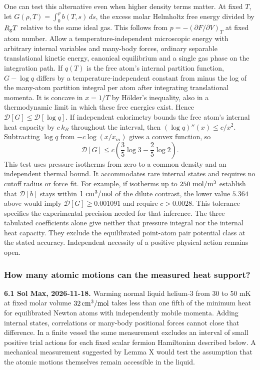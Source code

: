 \documentclass[11pt,a4paper]{article}
\begin{document}
One can test this alternative even when higher density terms matter. At
fixed \(T\), let \(G(\rho,T)=\int_0^\rho b(T,s)\,ds\), the excess molar
Helmholtz free energy divided by \(R_{\rm g}T\) relative to the same
ideal gas. This follows from \(p=-(\partial F/\partial V)_T\) at fixed
atom number. Allow a temperature-independent microscopic energy with
arbitrary internal variables and many-body forces, ordinary separable
translational kinetic energy, canonical equilibrium and a single gas
phase on the integration path. If \(q(T)\) is the free atom's internal
partition function, \(G-\log q\) differs by a temperature-independent
constant from minus the log of the many-atom partition integral per atom
after integrating translational momenta. It is concave in \(x=1/T\) by
Hölder's inequality, also in a thermodynamic limit in which these free
energies exist. Hence \(\mathcal D[G]\le\mathcal D[\log q]\). If
independent calorimetry bounds the free atom's internal heat capacity by
\(c\,k_B\) throughout the interval, then \((\log q)''(x)\le c/x^2\).
Subtracting \(\log q\) from \(-c\log(x/x_m)\) gives a convex function,
so \[
 \mathcal D[G]\le c\left(\frac35\log 3-\frac25\log 2\right).
\] This test uses pressure isotherms from zero to a common density and
an independent thermal bound. It accommodates rare internal states and
requires no cutoff radius or force fit. For example, if isotherms up to
\(250\ {\rm mol/m^3}\) establish that \(\mathcal D[b]\) stays within
\(1\ {\rm cm^3/mol}\) of the dilute contrast, the lower value \(5.364\)
above would imply \(\mathcal D[G]\ge0.001091\) and require \(c>0.0028\).
This tolerance specifies the experimental precision needed for that
inference. The three tabulated coefficients alone give neither that
pressure integral nor the internal heat capacity. They exclude the
equilibrated point-atom pair potential class at the stated accuracy.
Independent necessity of a positive physical action remains open.

\subsubsection{How many atomic motions can the measured heat
support?}\label{how-many-atomic-motions-can-the-measured-heat-support}

\textbf{6.1 Sol Max, 2026-11-18.} Warming normal liquid helium-3 from 30
to 50 mK at fixed molar volume \(32\,{\rm cm^3/mol}\) takes less than
one fifth of the minimum heat for equilibrated Newton atoms with
independently mobile momenta. Adding internal states, correlations or
many-body positional forces cannot close that difference. In a finite
vessel the same measurement excludes an interval of small positive trial
actions for each fixed scalar fermion Hamiltonian described below. A
mechanical measurement suggested by Lemma X would test the assumption
that the atomic motions themselves remain accessible in the liquid.
\end{document}
